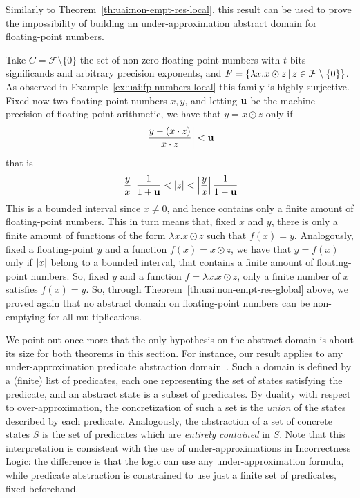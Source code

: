 Similarly to Theorem~\ref{th:uai:non-empt-res-local}, this result can be used to prove the impossibility of building an under-approximation abstract domain for floating-point numbers.
\begin{example}\label{ex:uai:fp-numbers-global}
	Take $C = \mathcal{F} \setminus \{ 0 \}$ the set of non-zero floating-point numbers with $t$ bits significands and arbitrary precision exponents, and $F = \{ \lambda x . x \odot z \,\vert\, z \in \mathcal{F} \setminus \{ 0 \} \}$.
	As observed in Example~\ref{ex:uai:fp-numbers-local} this family is highly surjective.
	Fixed now two floating-point numbers $x, y$, and letting $\textbf{u}$ be the machine precision of floating-point arithmetic, we have that $y = x \odot z$ only if
	\[
	\left\lvert \frac{y - (x \cdot z)}{x \cdot z} \right\rvert < \textbf{u}
	\]
	that is
	\[
	\left\lvert\frac{y}{x}\right\rvert \frac{1}{1+\textbf{u}} < \lvert z\rvert < \left\lvert\frac{y}{x}\right\rvert \frac{1}{1-\textbf{u}}
	\]
	This is a bounded interval since $x \neq 0$, and hence contains only a finite amount of floating-point numbers. This in turn means that, fixed $x$ and $y$, there is only a finite amount of functions of the form $\lambda x. x \odot z$ such that $f(x) = y$.
	Analogously, fixed a floating-point $y$ and a function $f(x) = x \odot z$, we have that $y = f(x)$ only if $\lvert x\rvert$ belong to a bounded interval, that contains a finite amount of floating-point numbers. So, fixed $y$ and a function $f = \lambda x . x \odot z$, only a finite number of $x$ satisfies $f(x) = y$.
	So, through Theorem~\ref{th:uai:non-empt-res-global} above, we proved again that no abstract domain on floating-point numbers can be non-emptying for all multiplications.
\end{example}

We point out once more that the only hypothesis on the abstract domain is about its size for both theorems in this section. For instance, our result applies to any under-approximation predicate abstraction domain~\cite{GS97}. Such a domain is defined by a (finite) list of predicates, each one representing the set of states satisfying the predicate, and an abstract state is a subset of predicates. By duality with respect to over-approximation, the concretization of such a set is the \emph{union} of the states described by each predicate. Analogously, the abstraction of a set of concrete states $S$ is the set of predicates which are \emph{entirely contained} in $S$. Note that this interpretation is consistent with the use of under-approximations in Incorrectness Logic: the difference is that the logic can use any under-approximation formula, while predicate abstraction is constrained to use just a finite set of predicates, fixed beforehand.

